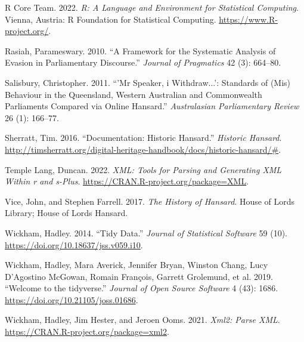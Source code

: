 \documentclass[
  letterpaper,
  DIV=11,
  numbers=noendperiod]{scrartcl}
\newlength{\cslhangindent}
\newlength{\cslentryspacingunit} %
\newenvironment{CSLReferences}[2] %
 {%
  \setlength{\parindent}{0pt}
  \ifodd #1
  \let\oldpar\par
  \def\par{\hangindent=\cslhangindent\oldpar}
  \fi
  \setlength{\parskip}{#2\cslentryspacingunit}
 }%
 {}
\begin{document}
\begin{CSLReferences}{1}{0}
\leavevmode{}%
R Core Team. 2022. \emph{R: A Language and Environment for Statistical
Computing}. Vienna, Austria: R Foundation for Statistical Computing.
\url{https://www.R-project.org/}.

\leavevmode{}%
Rasiah, Parameswary. 2010. {``A Framework for the Systematic Analysis of
Evasion in Parliamentary Discourse.''} \emph{Journal of Pragmatics} 42
(3): 664--80.

\leavevmode{}%
Salisbury, Christopher. 2011. {``'Mr Speaker, i Withdraw...': Standards
of (Mis) Behaviour in the Queensland, Western Australian and
Commonwealth Parliaments Compared via Online Hansard.''}
\emph{Australasian Parliamentary Review} 26 (1): 166--77.

\leavevmode{}%
Sherratt, Tim. 2016. {``Documentation: Historic Hansard.''}
\emph{Historic Hansard}.
\url{http://timsherratt.org/digital-heritage-handbook/docs/historic-hansard/\#}.

\leavevmode{}%
Temple Lang, Duncan. 2022. \emph{XML: Tools for Parsing and Generating
XML Within r and s-Plus}. \url{https://CRAN.R-project.org/package=XML}.

\leavevmode{}%
Vice, John, and Stephen Farrell. 2017. \emph{The History of Hansard}.
House of Lords Library; House of Lords Hansard.

\leavevmode{}%
Wickham, Hadley. 2014. {``Tidy Data.''} \emph{Journal of Statistical
Software} 59 (10). \url{https://doi.org/10.18637/jss.v059.i10}.

\leavevmode{}%
Wickham, Hadley, Mara Averick, Jennifer Bryan, Winston Chang, Lucy
D'Agostino McGowan, Romain François, Garrett Grolemund, et al. 2019.
{``Welcome to the {tidyverse}.''} \emph{Journal of Open Source Software}
4 (43): 1686. \url{https://doi.org/10.21105/joss.01686}.

\leavevmode{}%
Wickham, Hadley, Jim Hester, and Jeroen Ooms. 2021. \emph{Xml2: Parse
XML}. \url{https://CRAN.R-project.org/package=xml2}.

\end{CSLReferences}
\end{document}
